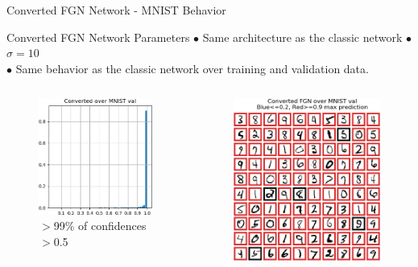 \documentclass{beamer}
\begin{document}
\begin{frame}{Converted FGN Network - MNIST Behavior}
    
    \begin{block}{Converted FGN Network Parameters}
    $\bullet$ Same architecture as the classic network $\bullet$ $\sigma = 10$\\
    $\bullet$ Same behavior as the classic network over training and validation data.
    \end{block}

    \begin{columns}
    \begin{column}{.5\textwidth}
    \begin{figure}
        \centering
        \includegraphics[width=.82\textwidth]{images/mnist-behavior/converted-hist-val.png}
        \caption*{ $>$99\% of confidences $>$0.5}
    \end{figure}
    \end{column}
    \begin{column}{.5\textwidth}
    \begin{figure}
        \raggedright
        \vspace{-3mm}
        \includegraphics[width=.73\textwidth]{images/mnist-behavior/converted-pred-val.png}

\end{figure}
\end{column}
\end{columns}
\end{frame}
\end{document}
